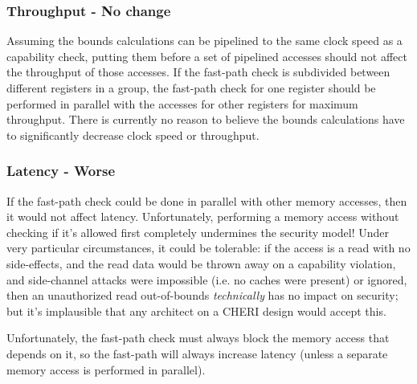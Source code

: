 \subsubsection*{Throughput - No change}
Assuming the bounds calculations can be pipelined to the same clock speed as a capability check, putting them before a set of pipelined accesses should not affect the throughput of those accesses.
If the fast-path check is subdivided between different registers in a group, the fast-path check for one register should be performed in parallel with the accesses for other registers for maximum throughput.
There is currently no reason to believe the bounds calculations have to significantly decrease clock speed or throughput.

\subsubsection*{Latency - Worse}
If the fast-path check could be done in parallel with other memory accesses, then it would not affect latency.
Unfortunately, performing a memory access without checking if it's allowed first completely undermines the security model!
Under very particular circumstances, it could be tolerable: if the access is a read with no side-effects, and the read data would be thrown away on a capability violation, and side-channel attacks were impossible (i.e. no caches were present) or ignored, then an unauthorized read out-of-bounds \emph{technically} has no impact on security; but it's implausible that any architect on a CHERI design would accept this.

Unfortunately, the fast-path check must always block the memory access that depends on it, so the fast-path will always increase latency (unless a separate memory access is performed in parallel).